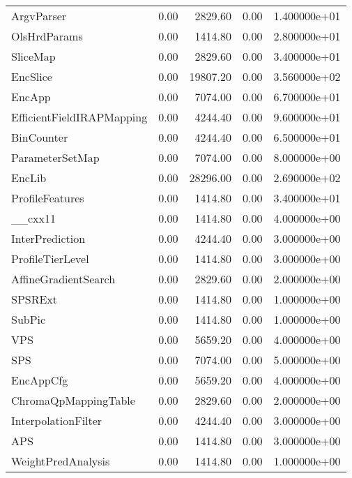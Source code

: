 \begin{tabular}{lrrrr}
ArgvParser                &   0.00 &   2829.60 &      0.00 &  1.400000e+01 \\
OlsHrdParams              &   0.00 &   1414.80 &      0.00 &  2.800000e+01 \\
SliceMap                  &   0.00 &   2829.60 &      0.00 &  3.400000e+01 \\
EncSlice                  &   0.00 &  19807.20 &      0.00 &  3.560000e+02 \\
EncApp                    &   0.00 &   7074.00 &      0.00 &  6.700000e+01 \\
EfficientFieldIRAPMapping &   0.00 &   4244.40 &      0.00 &  9.600000e+01 \\
BinCounter                &   0.00 &   4244.40 &      0.00 &  6.500000e+01 \\
ParameterSetMap           &   0.00 &   7074.00 &      0.00 &  8.000000e+00 \\
EncLib                    &   0.00 &  28296.00 &      0.00 &  2.690000e+02 \\
ProfileFeatures           &   0.00 &   1414.80 &      0.00 &  3.400000e+01 \\
\_\_cxx11                   &   0.00 &   1414.80 &      0.00 &  4.000000e+00 \\
InterPrediction           &   0.00 &   4244.40 &      0.00 &  3.000000e+00 \\
ProfileTierLevel          &   0.00 &   1414.80 &      0.00 &  3.000000e+00 \\
AffineGradientSearch      &   0.00 &   2829.60 &      0.00 &  2.000000e+00 \\
SPSRExt                   &   0.00 &   1414.80 &      0.00 &  1.000000e+00 \\
SubPic                    &   0.00 &   1414.80 &      0.00 &  1.000000e+00 \\
VPS                       &   0.00 &   5659.20 &      0.00 &  4.000000e+00 \\
SPS                       &   0.00 &   7074.00 &      0.00 &  5.000000e+00 \\
EncAppCfg                 &   0.00 &   5659.20 &      0.00 &  4.000000e+00 \\
ChromaQpMappingTable      &   0.00 &   2829.60 &      0.00 &  2.000000e+00 \\
InterpolationFilter       &   0.00 &   4244.40 &      0.00 &  3.000000e+00 \\
APS                       &   0.00 &   1414.80 &      0.00 &  3.000000e+00 \\
WeightPredAnalysis        &   0.00 &   1414.80 &      0.00 &  1.000000e+00 \\

\end{tabular}
